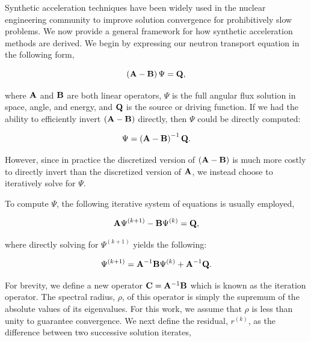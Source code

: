 Synthetic acceleration techniques have been widely used in the nuclear engineering community to improve solution convergence for prohibitively slow problems. We now provide a general framework for how synthetic acceleration methods are derived. We begin by expressing our neutron transport equation in the following form,

\begin{equation}
\label{eq::DSA_simple_trans_eq_w_ops}
\left(  {\bf A} - {\bf B}  \right) \Psi = {\bf Q} ,
\end{equation}

\noindent where ${\bf A}$ and ${\bf B}$ are both linear operators, $\Psi$ is the full angular flux solution in space, angle, and energy, and ${\bf Q}$ is the source or driving function. If we had the ability to efficiently invert $\left(  {\bf A} - {\bf B}  \right)$ directly, then $\Psi$ could be directly computed:

\begin{equation}
\label{eq::DSA_simple_trans_eq_w_ops_inverted}
\Psi = \left(  {\bf A} - {\bf B}  \right)^{-1} {\bf Q} .
\end{equation}

\noindent However, since in practice the discretized version of $\left(  {\bf A} - {\bf B}  \right)$ is much more costly to directly invert than the discretized version of ${\bf A}$, we instead choose to iteratively solve for $\Psi$.

To compute $\Psi$, the following iterative system of equations is usually employed,

\begin{equation}
\label{eq::DSA_simple_trans_eq_w_ops_iterates}
 {\bf A} \Psi^{(k+1)} - {\bf B}  \Psi^{(k)} = {\bf Q} ,
\end{equation}

\noindent where directly solving for $\Psi^{(k+1)}$ yields the following:

\begin{equation}
\label{eq::DSA_simple_trans_eq_sol_w_ops_iterates}
 \Psi^{(k+1)} =  {\bf A}^{-1} {\bf B}  \Psi^{(k)} +  {\bf A}^{-1} {\bf Q} .
\end{equation}

\noindent For brevity, we define a new operator ${\bf C} = {\bf A}^{-1} {\bf B}$ which is known as the iteration operator. The spectral radius, $\rho$, of this operator is simply the supremum of the absolute values of its eigenvalues. For this work, we assume that $\rho$ is less than unity to guarantee convergence. We next define the residual, $r^{(k)}$, as the difference between two successive solution iterates,

